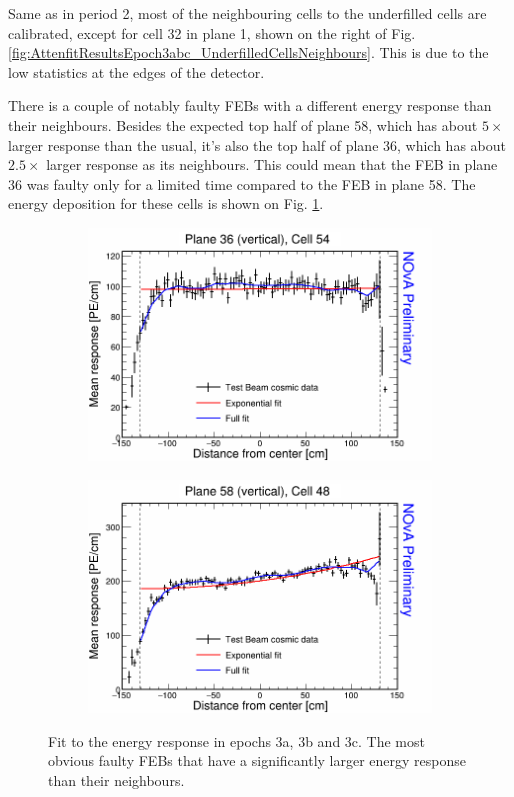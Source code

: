 Same as in period 2, most of the neighbouring cells to the underfilled cells are calibrated, except for cell 32 in plane 1, shown on the right of Fig. \ref{fig:AttenfitResultsEpoch3abc_UnderfilledCellsNeighbours}. This is due to the low statistics at the edges of the detector.

There is a couple of notably faulty FEBs with a different energy response than their neighbours. Besides the expected top half of plane 58, which has about $5\times$ larger response than the usual, it's also the top half of plane 36, which has about $2.5\times$ larger response as its neighbours. This could mean that the FEB in plane 36 was faulty only for a limited time compared to the FEB in plane 58. The energy deposition for these cells is shown on Fig. \ref{fig:AttenfitResultsEpoch3abc_FaultyFEBs}.

\begin{figure}[h]
  \begin{subfigure}{0.5\textwidth}
    \includegraphics[width=\linewidth]{RelativeCalibrationResults/ep3abc_036_054.png}
  \end{subfigure}
  \begin{subfigure}{0.5\textwidth}
    \includegraphics[width=\linewidth]{RelativeCalibrationResults/ep3abc_058_048.png}
  \end{subfigure}
  \caption{Fit to the energy response in epochs 3a, 3b and 3c. The most obvious faulty FEBs that have a significantly larger energy response than their neighbours.}
  \label{fig:AttenfitResultsEpoch3abc_FaultyFEBs}
\end{figure}

